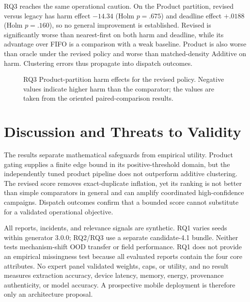 \documentclass[runningheads]{llncs}
\begin{document}
RQ3 reaches the same operational caution. On the Product partition, revised
versus legacy has harm effect $-14.34$ (Holm $p=.675$) and deadline effect
$+.0188$ (Holm $p=.160$), so no general improvement is established. Revised
is significantly worse than nearest-first on both harm and deadline, while
its advantage over FIFO is a comparison with a weak baseline. Product is
also worse than oracle under the revised policy and worse than matched-density
Additive on harm. Clustering errors thus propagate into dispatch outcomes.

\begin{figure}[t]
\centering
{}
\caption{RQ3 Product-partition harm effects for the revised policy. Negative
values indicate higher harm than the comparator; the values are taken from
the oriented paired-comparison results.}
\label{fig:rq3-harm}
\end{figure}

\section{Discussion and Threats to Validity}

The results separate mathematical safeguards from empirical utility. Product
gating supplies a finite edge bound in its positive-threshold domain, but the
independently tuned product pipeline does not outperform additive clustering.
The revised score removes exact-duplicate inflation, yet its ranking is not
better than simple comparators in general and can amplify coordinated
high-confidence campaigns. Dispatch outcomes confirm that a bounded score
cannot substitute for a validated operational objective.

All reports, incidents, and relevance signals are synthetic. RQ1 varies seeds
within generator 3.0.0; RQ2/RQ3 use a separate candidate-4.1 bundle. Neither
tests mechanism-shift OOD transfer or field performance. RQ1 does not provide
an empirical missingness test because all evaluated reports contain the four
core attributes. No expert panel validated weights, caps, or utility, and no
result measures extraction accuracy, device latency, memory, energy,
provenance authenticity, or model accuracy. A prospective mobile deployment
is therefore only an architecture proposal.
\end{document}
